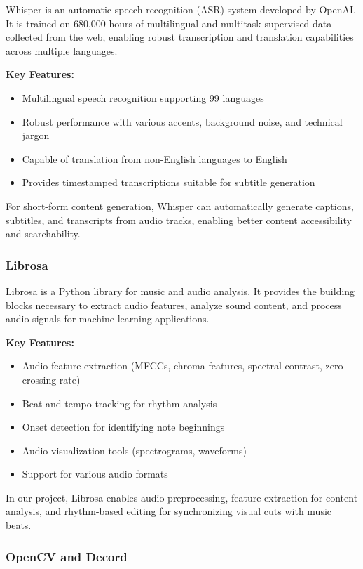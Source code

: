 \documentclass[12pt,a4paper,oneside,english]{book}
\begin{document}
Whisper is an automatic speech recognition (ASR) system developed by OpenAI. It is trained on 680,000 hours of multilingual and multitask supervised data collected from the web, enabling robust transcription and translation capabilities across multiple languages.

\textbf{Key Features:}
\begin{itemize}
    \item Multilingual speech recognition supporting 99 languages
    \item Robust performance with various accents, background noise, and technical jargon
    \item Capable of translation from non-English languages to English
    \item Provides timestamped transcriptions suitable for subtitle generation
\end{itemize}

For short-form content generation, Whisper can automatically generate captions, subtitles, and transcripts from audio tracks, enabling better content accessibility and searchability.

\subsubsection{Librosa}
\label{subsubsec:librosa}

Librosa is a Python library for music and audio analysis. It provides the building blocks necessary to extract audio features, analyze sound content, and process audio signals for machine learning applications.

\textbf{Key Features:}
\begin{itemize}
    \item Audio feature extraction (MFCCs, chroma features, spectral contrast, zero-crossing rate)
    \item Beat and tempo tracking for rhythm analysis
    \item Onset detection for identifying note beginnings
    \item Audio visualization tools (spectrograms, waveforms)
    \item Support for various audio formats
\end{itemize}

In our project, Librosa enables audio preprocessing, feature extraction for content analysis, and rhythm-based editing for synchronizing visual cuts with music beats.

\subsubsection{OpenCV and Decord}
\label{subsubsec:opencv_decord}
\end{document}
